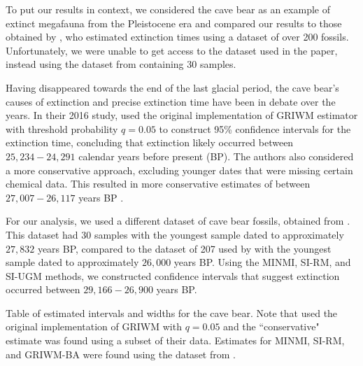 To put our results in context, we considered the cave bear as an example of extinct megafauna from the Pleistocene era and compared our results to those obtained by \citet{Baca2016}, who estimated extinction times using a dataset of over 200 fossils. Unfortunately, we were unable to get access to the dataset used in the paper, instead using the dataset from \citet{Cooper2015} containing 30 samples.

Having disappeared towards the end of the last glacial period, the cave bear's causes of extinction and precise extinction time have been in debate over the years. In their 2016 study, \citet{Baca2016} used the original implementation of GRIWM estimator with threshold probability $q = 0.05$ to construct 95\% confidence intervals for the extinction time, concluding that extinction likely occurred between $25,234 - 24,291$ calendar years before present (BP). The authors also considered a more conservative approach, excluding younger dates that were missing certain chemical data. This resulted in more conservative estimates of between $27,007 - 26,117$ years BP \cite{Baca2016}. %

For our analysis, we used a different dataset of cave bear fossils, obtained from \citet{Cooper2015}. This dataset had 30 samples with the youngest sample dated to approximately $27,832$ years BP, compared to the dataset of 207 used by \citet{Baca2016} with the youngest sample dated to approximately $26,000$ years BP. Using the MINMI, SI-RM, and SI-UGM methods, we constructed confidence intervals that suggest extinction occurred between $29,166 - 26,900$ years BP.
\begin{table}[ht]
    \centering
    \caption{Table of estimated intervals and widths for the cave bear. Note that \citet{Baca2016} used the original implementation of GRIWM with $q=0.05$ and the ``conservative" estimate was found using a subset of their data. Estimates for MINMI, SI-RM, and GRIWM-BA were found using the dataset from \citet{Cooper2015}.}
    
    \label{tab:case-study-intervals}
    \vspace{-4mm}
\end{table}

